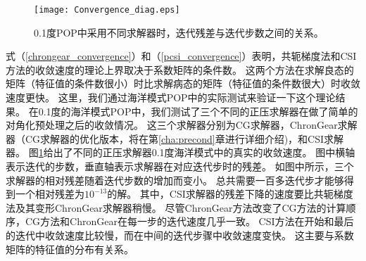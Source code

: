 \begin {figure}
\vspace{10pt}
\centering
\texttt{[image: Convergence\_diag.eps]}
\caption[] {0.1度POP中采用不同求解器时，迭代残差与迭代步数之间的关系。\label{fig:convergence_diag}}
\end{figure}
式（\ref{chrongear_convergence}）和（\ref{pcsi_convergence}）表明，共轭梯度法和CSI方法的收敛速度的理论上界取决于系数矩阵的条件数。 
这两个方法在求解良态的矩阵（特征值的条件数很小）时比求解病态的矩阵（特征值的条件数很大）时收敛速度更快。
这里，我们通过海洋模式POP中的实际测试来验证一下这个理论结果。 
在0.1度的海洋模式POP中，我们测试了三个不同的正压求解器在做了简单的对角化预处理之后的收敛情况。
这三个求解器分别为CG求解器，ChronGear求解器（CG求解器的优化版本，将在第\ref{cha:precond}章进行详细介绍)，和CSI求解器。
图\ref{fig:convergence_diag}给出了不同的正压求解器0.1度海洋模式中的真实的收敛速度。
图中横轴表示迭代的步数，垂直轴表示求解器在对应迭代步时的残差。 
如图中所示，三个求解器的相对残差随着迭代步数的增加而变小。
总共需要一百多迭代步才能够得到一个相对残差为$10^{-13}$的解。
其中，CSI求解器的残差下降的速度要比共轭梯度法及其变形ChronGear求解器稍慢。
尽管ChronGear方法改变了CG方法的计算顺序，CG方法和ChronGear在每一步的迭代速度几乎一致。
CSI方法在开始和最后的迭代中收敛速度比较慢，而在中间的迭代步骤中收敛速度变快。
这主要与系数矩阵的特征值的分布有关系。 


